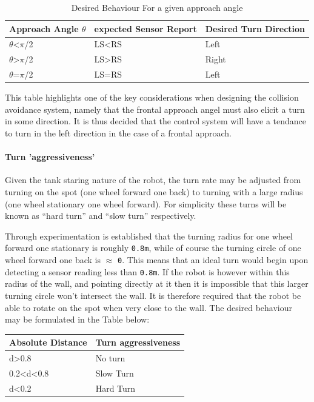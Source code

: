 \documentclass[11pt]{article}
\numberwithin{equation}{section}
\begin{document}
\begin{table}[H]
\caption{\label{tabApproachAngleDesiredBehaviour}Desired Behaviour For a given approach angle}
\centering
\begin{tabular}{lll}
\toprule
Approach Angle \(\theta\) & expected Sensor Report & Desired Turn Direction\\
\midrule
\(\theta\)<\(\pi\)/2 & LS<RS & Left\\
\(\theta\)>\(\pi\)/2 & LS>RS & Right\\
\(\theta\)=\(\pi\)/2 & LS=RS & Left\\
\bottomrule
\end{tabular}
\end{table}

This table highlights one of the key considerations when designing the collision avoidance system, namely that the frontal approach angel must also elicit a turn in some direction. It is thus decided that the control system will have a tendance to turn in the left direction in the case of a frontal approach.

\paragraph{Turn 'aggressiveness'}
\label{sec:org43063c9}
Given the tank staring nature of the robot, the turn rate may be adjusted from turning on the spot (one wheel forward one back) to turning with a large radius (one wheel stationary one wheel forward). For simplicity these turns will be known as ``hard turn'' and ``slow turn'' respectively.

Through experimentation is established that the turning radius for one wheel forward one stationary is roughly \texttt{0.8m}, while of course the turning circle of one wheel forward one back is \(\approx\) \texttt{0}. This means that an ideal turn would begin upon detecting a sensor reading less than \texttt{0.8m}. If the robot is however within this radius of the wall, and pointing directly at it then it is impossible that this larger turning circle won't intersect the wall. It is therefore required that the robot be able to rotate on the spot when very close to the wall. The desired behaviour may be formulated in the Table below:

\begin{center}
\begin{tabular}{ll}
Absolute Distance & Turn aggressiveness\\
\hline
d>0.8 & No turn\\
0.2<d<0.8 & Slow Turn\\
d<0.2 & Hard Turn\\
\end{tabular}
\end{center}
\end{document}
